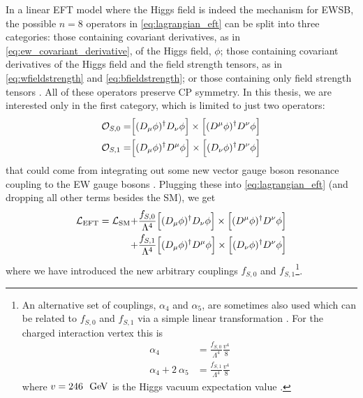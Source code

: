 
In a linear EFT model where the Higgs field is indeed the mechanism for EWSB, 
the possible $n=8$ operators 
in \eqn\eqref{eq:lagrangian_eft} can
be split into three categories: those containing covariant derivatives,
as in \eqn\eqref{eq:ew_covariant_derivative}, of the Higgs field, $\phi$; 
those containing covariant derivatives of the Higgs field and 
the field strength tensors, as 
in \eqn\eqref{eq:wfieldstrength} and \eqref{eq:bfieldstrength};
or those containing only field strength tensors \cite{Eboli:2006wa,Eboli:2003nq}. 
All of these operators preserve CP symmetry.
In this thesis, we are
interested only in the first category, which is limited to just two operators:
\begin{align}
\mathcal{O}_{S,0} =& \Big[(D_{\mu}\phi)^{\dagger} D_{\nu} \phi\Big] \times \Big[(D^{\mu} \phi)^{\dagger} D^{\nu} \phi \Big] \\
\mathcal{O}_{S,1} =& \Big[(D_{\mu}\phi)^{\dagger} D^{\mu} \phi\Big] \times \Big[(D_{\nu} \phi)^{\dagger} D^{\nu} \phi \Big]
\end{align}
that could come from integrating out some new 
vector gauge boson resonance coupling to the EW gauge bosons \cite{Baak:2013fwa}.
Plugging these into \eqn\eqref{eq:lagrangian_eft} (and dropping all other terms
besides the SM), we get
\begin{equation}
\begin{aligned}
\mathcal{L}_{\textrm{EFT}} = \mathcal{L}_{\textrm{SM}} +&
\frac{f_{S,0}}{\Lambda^4}\Big[(D_{\mu}\phi)^{\dagger} D_{\nu} \phi\Big] \times \Big[(D^{\mu} \phi)^{\dagger} D^{\nu} \phi \Big] \\
+& \frac{f_{S,1}}{\Lambda^4}\Big[(D_{\mu}\phi)^{\dagger} D^{\mu} \phi\Big] \times \Big[(D_{\nu} \phi)^{\dagger} D^{\nu} \phi \Big]
\end{aligned}
\label{eq:lagrangian_aqgc}
\end{equation}
where we have introduced the new arbitrary couplings $f_{S,0}$ 
and $f_{S,1}$\footnote{An alternative set of couplings, $\alpha_4$ and $\alpha_5$, are sometimes also used
which can be related to $f_{S,0}$ and $f_{S,1}$ via a simple linear transformation \cite{Baak:2013fwa}. 
For the charged interaction vertex this is 
\begin{equation}
\begin{aligned}
\alpha_4 &= \frac{f_{S,0}}{\Lambda^4} \frac{v^4}{8} \\
\alpha_4 + 2~\alpha_5 &= \frac{f_{S,1}}{\Lambda^4} \frac{v^4}{8}
\end{aligned}
\label{eq:alpha45}
\end{equation}
where $v=246~\GeV$ is the Higgs vacuum expectation value \cite{PDG:2014}.}.

